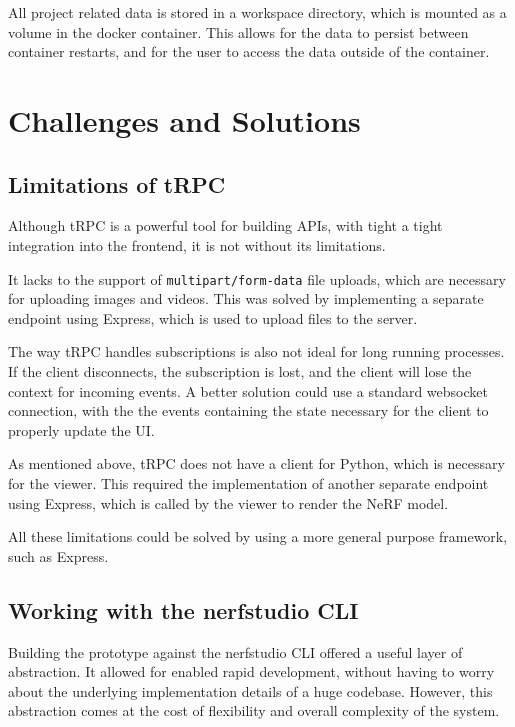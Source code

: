 All project related data is stored in a workspace directory, which is mounted as a volume in the docker container. 
This allows for the data to persist between container restarts, and for the user to access the data outside of the container.

\section{Challenges and Solutions}
\label{sec:system:challenges}

\subsection{Limitations of tRPC}

Although tRPC is a powerful tool for building APIs, with tight a tight integration into the frontend, it is not without its limitations.

It lacks to the support of \texttt{multipart/form-data} file uploads, which are necessary for uploading images and videos.
This was solved by implementing a separate endpoint using Express, which is used to upload files to the server.

The way tRPC handles subscriptions is also not ideal for long running processes.
If the client disconnects, the subscription is lost, and the client will lose the context for incoming events.
A better solution could use a standard websocket connection, with the the events containing the state necessary for the client to properly update the UI.

As mentioned above, tRPC does not have a client for Python, which is necessary for the viewer. 
This required the implementation of another separate endpoint using Express, which is called by the viewer to render the NeRF model.

All these limitations could be solved by using a more general purpose framework, such as Express.

\subsection{Working with the nerfstudio CLI}

Building the prototype against the nerfstudio CLI offered a useful layer of abstraction.
It allowed for enabled rapid development, without having to worry about the underlying implementation details of a huge codebase.
However, this abstraction comes at the cost of flexibility and overall complexity of the system.

